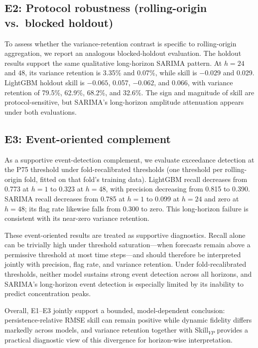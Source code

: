 \documentclass{article}
\begin{document}
\subsection{E2: Protocol robustness (rolling-origin vs.\ blocked holdout)}

To assess whether the variance-retention contrast is specific to rolling-origin
aggregation, we report an analogous blocked-holdout evaluation.
The holdout results support the same qualitative long-horizon SARIMA pattern.
At $h=24$ and $48$, its variance retention is 3.35\% and 0.07\%, while skill
is $-0.029$ and 0.029.  LightGBM holdout skill is $-0.065$, 0.057,
$-0.062$, and 0.066, with variance retention of 79.5\%, 62.9\%, 68.2\%, and
32.6\%.  The sign and magnitude of skill are protocol-sensitive, but SARIMA's
long-horizon amplitude attenuation appears under both evaluations.

\subsection{E3: Event-oriented complement}

As a supportive event-detection complement, we evaluate exceedance detection at
the P75 threshold under fold-recalibrated thresholds (one threshold per
rolling-origin fold, fitted on that fold's training data).
LightGBM recall decreases from 0.773 at $h=1$ to 0.323 at $h=48$, with
precision decreasing from 0.815 to 0.390.  SARIMA recall decreases from 0.785
at $h=1$ to 0.099 at $h=24$ and zero at $h=48$; its flag rate likewise falls
from 0.300 to zero.  This long-horizon failure is consistent with its near-zero
variance retention.

These event-oriented results are treated as supportive diagnostics.
Recall alone can be trivially high under threshold saturation—when forecasts
remain above a permissive threshold at most time steps—and should therefore be
interpreted jointly with precision, flag rate, and variance retention.
Under fold-recalibrated thresholds, neither model sustains strong event
detection across all horizons, and SARIMA's long-horizon event detection is
especially limited by its inability to predict concentration peaks.

Overall, E1--E3 jointly support a bounded, model-dependent conclusion:
persistence-relative RMSE skill can remain positive while dynamic fidelity
differs markedly across models, and variance retention together with
Skill$_{VP}$ provides a practical diagnostic view of this divergence for
horizon-wise interpretation.
\end{document}
